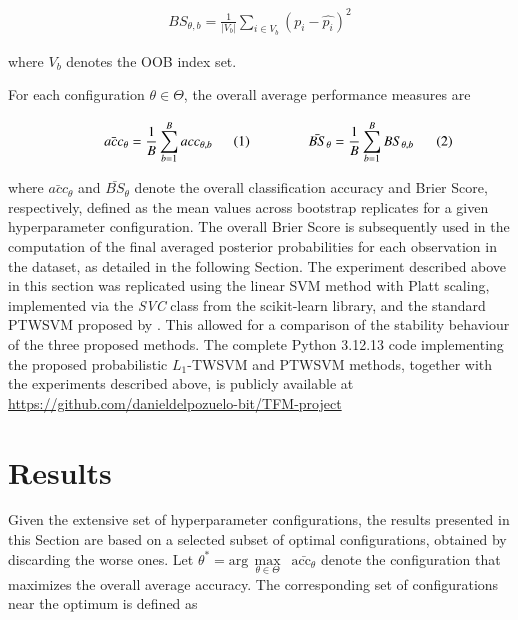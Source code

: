 \documentclass[12pt]{report} %
\begin{document}
\begin{align}
BS_{\theta, b} = \frac{1}{|V_b|}\sum_{i\in V_b}(p_i -\hat{p_i})^{2}
\end{align}

where $V_b$ denotes the OOB index set.

For each configuration $\theta \in \Theta$, the overall average performance measures are

\begin{subequations}
\begin{minipage}{0.38\textwidth}
\begin{equation}
\label{eq:overall_acc}
\bar{acc}_{\theta} = \frac{1}{B} \sum_{b=1}^{B} acc_{\theta, b}
\end{equation}
\end{minipage}
\hspace{0.5cm}
\begin{minipage}{0.38\textwidth}
\begin{equation}
\label{eq:overall_bs}
\bar{BS}_{\theta} = \frac{1}{B} \sum_{b=1}^{B} BS_{\theta, b}
\end{equation}
\end{minipage}
\end{subequations}

where $\bar{acc}_{\theta}$ and $\bar{BS}_{\theta}$ denote the overall classification accuracy and Brier Score, respectively, defined as the mean values across bootstrap replicates for a given hyperparameter configuration. The overall Brier Score is subsequently used in the computation of the final averaged posterior probabilities for each observation in the dataset, as detailed in the following Section. The experiment described above in this section was replicated using the linear SVM method with Platt scaling, implemented via the \textit{SVC} class from the scikit-learn library, and the standard PTWSVM proposed by \cite{shao2012probabilistic}. This allowed for a comparison of the stability behaviour of the three proposed methods. The complete Python 3.12.13 code implementing the proposed probabilistic $L_1$-TWSVM and PTWSVM methods, together with the experiments described above, is publicly available at \url{https://github.com/danieldelpozuelo-bit/TFM-project}



\chapter{Results} \label{chap:results}

Given the extensive set of hyperparameter configurations, the results presented in this Section are based on a selected subset of optimal configurations, obtained by discarding the worse ones. Let $\theta^* = \text{arg}\,\underset{{\theta \in \Theta}}{\max}\,\,\,\bar{\text{acc}_{\theta}}$ denote the configuration that maximizes the overall average accuracy. The corresponding set of configurations near the optimum is defined as
\end{document}
